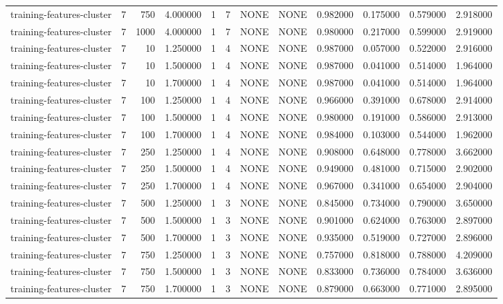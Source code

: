 \begin{tabular}{lrrrllllrrrr}
training-features-cluster & 7 & 750 & 4.000000 & 1 & 7 & NONE & NONE & 0.982000 & 0.175000 & 0.579000 & 2.918000 \\
training-features-cluster & 7 & 1000 & 4.000000 & 1 & 7 & NONE & NONE & 0.980000 & 0.217000 & 0.599000 & 2.919000 \\
training-features-cluster & 7 & 10 & 1.250000 & 1 & 4 & NONE & NONE & 0.987000 & 0.057000 & 0.522000 & 2.916000 \\
training-features-cluster & 7 & 10 & 1.500000 & 1 & 4 & NONE & NONE & 0.987000 & 0.041000 & 0.514000 & 1.964000 \\
training-features-cluster & 7 & 10 & 1.700000 & 1 & 4 & NONE & NONE & 0.987000 & 0.041000 & 0.514000 & 1.964000 \\
training-features-cluster & 7 & 100 & 1.250000 & 1 & 4 & NONE & NONE & 0.966000 & 0.391000 & 0.678000 & 2.914000 \\
training-features-cluster & 7 & 100 & 1.500000 & 1 & 4 & NONE & NONE & 0.980000 & 0.191000 & 0.586000 & 2.913000 \\
training-features-cluster & 7 & 100 & 1.700000 & 1 & 4 & NONE & NONE & 0.984000 & 0.103000 & 0.544000 & 1.962000 \\
training-features-cluster & 7 & 250 & 1.250000 & 1 & 4 & NONE & NONE & 0.908000 & 0.648000 & 0.778000 & 3.662000 \\
training-features-cluster & 7 & 250 & 1.500000 & 1 & 4 & NONE & NONE & 0.949000 & 0.481000 & 0.715000 & 2.902000 \\
training-features-cluster & 7 & 250 & 1.700000 & 1 & 4 & NONE & NONE & 0.967000 & 0.341000 & 0.654000 & 2.904000 \\
training-features-cluster & 7 & 500 & 1.250000 & 1 & 3 & NONE & NONE & 0.845000 & 0.734000 & 0.790000 & 3.650000 \\
training-features-cluster & 7 & 500 & 1.500000 & 1 & 3 & NONE & NONE & 0.901000 & 0.624000 & 0.763000 & 2.897000 \\
training-features-cluster & 7 & 500 & 1.700000 & 1 & 3 & NONE & NONE & 0.935000 & 0.519000 & 0.727000 & 2.896000 \\
training-features-cluster & 7 & 750 & 1.250000 & 1 & 3 & NONE & NONE & 0.757000 & 0.818000 & 0.788000 & 4.209000 \\
training-features-cluster & 7 & 750 & 1.500000 & 1 & 3 & NONE & NONE & 0.833000 & 0.736000 & 0.784000 & 3.636000 \\
training-features-cluster & 7 & 750 & 1.700000 & 1 & 3 & NONE & NONE & 0.879000 & 0.663000 & 0.771000 & 2.895000 \\

\end{tabular}
